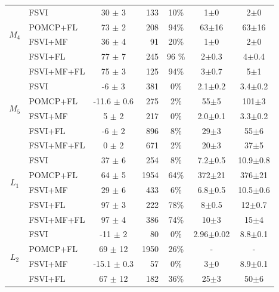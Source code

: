 \documentclass[letterpaper]{article} %
\newcommand{\itay}[1]{}
\begin{document}
\begin{table}
{\begin{tabular}{ |c|l|c|r|c|c|c| }
    \multirow{4}{*}{$M_4$}
    & FSVI\itay{+} & 30 $\pm$ 3 & 133 & 10\% & 1$\pm$0 & 2$\pm$0 \\
    & POMCP+FL\itay{+} & 73 $\pm$ 2 & 208 & 94\% & 63$\pm$16 & 63$\pm$16 \\
    & FSVI+MF\itay{+} & 36 $\pm$ 4 & 91 & 20\% & 1$\pm$0 & 2$\pm$0 \\
    &FSVI+FL\itay{+} & 77 $\pm$ 7 & 245 & 96 \% & 2$\pm$0.3 & 4$\pm$0.4 \\
    & FSVI+MF+FL\itay{+} & 75 $\pm$ 3 & 125 & 94\% & 3$\pm$0.7 & 5$\pm$1 \\
    \hline\hline
    \multirow{4}{*}{$M_5$}
    & FSVI\itay{+} & -6 $\pm$ 3 & 381 & 0\% & 2.1$\pm$0.2 & 3.4$\pm$0.2 \\
    & POMCP+FL\itay{+} & -11.6 $\pm$ 0.6 & 275 & 2\% & 55$\pm$5 & 101$\pm$3 \\
    & FSVI+MF\itay{+} & 5 $\pm$ 2 & 217 & 0\% & 2.0$\pm$0.1 & 3.3$\pm$0.2 \\
    &FSVI+FL\itay{+} & -6 $\pm$ 2 & 896 & 8\% & 29$\pm$3 & 55$\pm$6 \\
    & FSVI+MF+FL\itay{+} & 0 $\pm$ 2 & 671 & 2\% & 20$\pm$3 & 37$\pm$5 \\
    \hline\hline
    \multirow{4}{*}{$L_1$}
    & FSVI\itay{+} & 37 $\pm$ 6 & 254 & 8\% &  7.2$\pm$0.5 & 10.9$\pm$0.8 \\
    & POMCP+FL\itay{+} & 64 $\pm$ 5 & 1954 & 64\% &  372$\pm$21 & 376$\pm$21 \\
    & FSVI+MF\itay{+} & 29 $\pm$ 6 & 433 & 6\% &  6.8$\pm$0.5 & 10.5$\pm$0.6 \\
    &FSVI+FL\itay{+} & 97 $\pm$ 3 & 222 & 78\% &  8$\pm$0.5 & 12$\pm$0.7 \\
    & FSVI+MF+FL\itay{+} & 97 $\pm$ 4 & 386 & 74\% &  10$\pm$3 & 15$\pm$4 \\
    \hline\hline
    \multirow{4}{*}{$L_2$}
    & FSVI\itay{+} & -11 $\pm$ 2 & 80 & 0\% &  2.96$\pm$0.02 & 8.8$\pm$0.1 \\
    & POMCP+FL\itay{-} & 69 $\pm$ 12 & 1950 & 26\% &  - & - \\
    & FSVI+MF\itay{+} & -15.1 $\pm$ 0.3 & 57 & 0\% &  3$\pm$0 & 8.9$\pm$0.1 \\
    &FSVI+FL\itay{+} & 67 $\pm$ 12 & 182 & 36\% &  25$\pm$3 & 50$\pm$6 \\

\end{tabular}}
\end{table}
\end{document}
